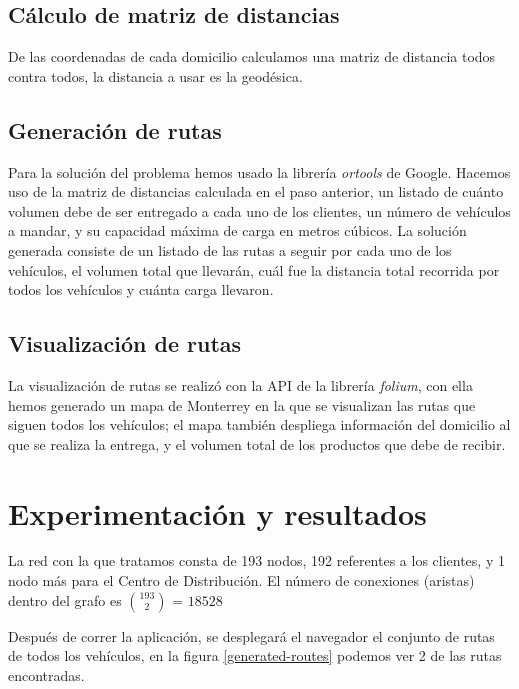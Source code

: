 \documentclass[journal]{IEEEtran}
\begin{document}
        \subsection{Cálculo de matriz de distancias} \label{stage 3}
            
            De las coordenadas de cada domicilio calculamos una matriz de distancia todos contra todos, la distancia a usar es la geodésica.

        \subsection{Generación de rutas} \label{stage 4}
        
            Para la solución del problema hemos usado la librería \emph{ortools} de Google. Hacemos uso de la matriz de distancias calculada en el paso anterior, un listado de cuánto volumen debe de ser entregado a cada uno de los clientes, un número de vehículos a mandar, y su capacidad máxima de carga en metros cúbicos. La solución generada consiste de un listado de las rutas a seguir por cada uno de los vehículos, el volumen total que llevarán, cuál fue la distancia total recorrida por todos los vehículos y cuánta carga llevaron.

        \subsection{Visualización de rutas} 
            
            La visualización de rutas se realizó con la API de la librería \emph{folium}, con ella hemos generado un mapa de Monterrey en la que se visualizan las rutas que siguen todos los vehículos; el mapa también despliega información del domicilio al que se realiza la entrega, y el volumen total de los productos que debe de recibir.
            
    \section{Experimentación y resultados}
    
        La red con la que tratamos consta de 193 nodos, 192 referentes a los clientes, y 1 nodo más para el Centro de Distribución. El número de conexiones (aristas) dentro del grafo es $193\choose2$ = $18528$
    
        Después de correr la aplicación, se desplegará el navegador el conjunto de rutas de todos los vehículos, en la figura \ref{generated-routes} podemos ver 2 de las rutas encontradas.
    
\end{document}
